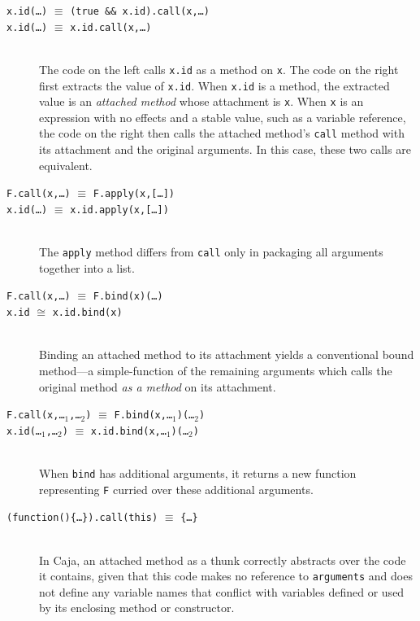 \documentclass[letterpaper,twocolumn,10pt]{article}
\newcommand{\code}[1]{{\tt {#1}}}              %
\begin{document}
\begin{description}

  \item[\code{x.id(\ldots)} $\equiv$ \code{(true \&\& x.id).call(x,\ldots)}]
  
  \item[\code{x.id(\ldots)} $\equiv$ \code{x.id.call(x,\ldots)}]
  
  \ \\
  The code on the left calls \code{x.id} as a method on \code{x}. The code on 
  the right first extracts the value of \code{x.id}. When \code{x.id} is a 
  method, the extracted value is an \emph{attached method} whose attachment 
  is \code{x}. When \code{x} is an expression with no effects and a stable 
  value, such as a variable reference, the code on the right then calls the 
  attached method's \code{call} method with its attachment and the original 
  arguments. In this case, these two calls are equivalent.
  
  \item[\code{F.call(x,\ldots)} $\equiv$ \code{F.apply(x,[\ldots])}]
  \item[\code{x.id(\ldots)} $\equiv$ \code{x.id.apply(x,[\ldots])}]
  
  \ \\
  The \code{apply} method differs from \code{call} only in packaging all 
  arguments together into a list.
  
  \item[\code{F.call(x,\ldots)} $\equiv$ \code{F.bind(x)(\ldots)}]
  \item[\code{x.id} $\cong$ \code{x.id.bind(x)}]
    
  \ \\
  Binding an attached method to its attachment yields a conventional bound 
  method---a simple-function of the remaining arguments which calls the 
  original method \emph{as a method} on its attachment.
  
  \item[\code{F.call(x,\ldots$_1$,\ldots$_2$)} $\equiv$ 
  \code{F.bind(x,\ldots$_1$)(\ldots$_2$)}]
  \item[\code{x.id(\ldots$_1$,\ldots$_2$)} $\equiv$ 
  \code{x.id.bind(x,\ldots$_1$)(\ldots$_2$)}]

  \ \\
  When \code{bind} has additional arguments, it returns a new function 
  representing \code{F} curried over these additional arguments.
  
  \item[\code{(function()\{{\ldots}\}).call(this)} $\equiv$ 
  \code{\{{\ldots}\}}]
  
  \ \\
  In Caja, an attached method as a thunk correctly abstracts over the code it 
  contains, given that this code makes no reference to \code{arguments} and 
  does not define any variable names that conflict with variables defined or
  used by its enclosing method or constructor.

\end{description}
\end{document}
